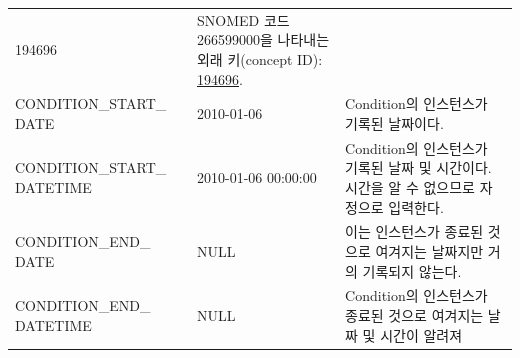 \documentclass[10.5pt]{book}
\theoremstyle{definition}
\theoremstyle{definition}
\theoremstyle{definition}
\theoremstyle{remark}
\begin{document}
\begin{longtable}[]{@{}lll@{}}
\begin{minipage}[t]{0.16\columnwidth}
194696\strut
\end{minipage} & \begin{minipage}[t]{0.48\columnwidth}\raggedright\strut
SNOMED 코드 266599000을 나타내는 외래 키(concept ID):
\href{http://athena.ohdsi.org/search-terms/terms/194696}{194696}.\strut
\end{minipage}\tabularnewline
\begin{minipage}[t]{0.28\columnwidth}\raggedright\strut
CONDITION\_START\_ DATE\strut
\end{minipage} & \begin{minipage}[t]{0.16\columnwidth}\raggedright\strut
2010-01-06\strut
\end{minipage} & \begin{minipage}[t]{0.48\columnwidth}\raggedright\strut
Condition의 인스턴스가 기록된 날짜이다.\strut
\end{minipage}\tabularnewline
\begin{minipage}[t]{0.28\columnwidth}\raggedright\strut
CONDITION\_START\_ DATETIME\strut
\end{minipage} & \begin{minipage}[t]{0.16\columnwidth}\raggedright\strut
2010-01-06 00:00:00\strut
\end{minipage} & \begin{minipage}[t]{0.48\columnwidth}\raggedright\strut
Condition의 인스턴스가 기록된 날짜 및 시간이다. 시간을 알 수 없으므로
자정으로 입력한다.\strut
\end{minipage}\tabularnewline
\begin{minipage}[t]{0.28\columnwidth}\raggedright\strut
CONDITION\_END\_ DATE\strut
\end{minipage} & \begin{minipage}[t]{0.16\columnwidth}\raggedright\strut
NULL\strut
\end{minipage} & \begin{minipage}[t]{0.48\columnwidth}\raggedright\strut
이는 인스턴스가 종료된 것으로 여겨지는 날짜지만 거의 기록되지
않는다.\strut
\end{minipage}\tabularnewline
\begin{minipage}[t]{0.28\columnwidth}\raggedright\strut
CONDITION\_END\_ DATETIME\strut
\end{minipage} & \begin{minipage}[t]{0.16\columnwidth}\raggedright\strut
NULL\strut
\end{minipage} & \begin{minipage}[t]{0.48\columnwidth}\raggedright\strut
Condition의 인스턴스가 종료된 것으로 여겨지는 날짜 및 시간이 알려져

\end{minipage}
\end{longtable}
\end{document}
